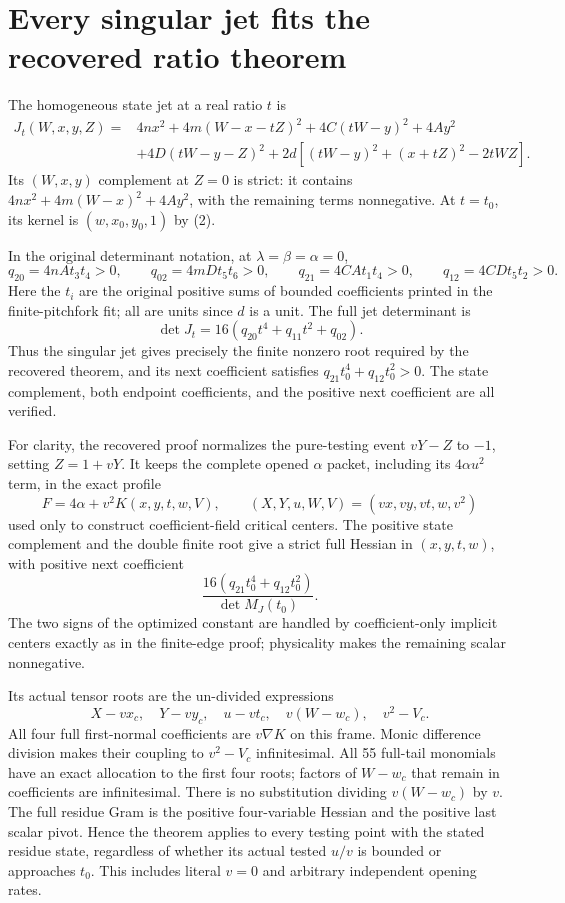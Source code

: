 \section{Every singular jet fits the recovered ratio theorem}

The homogeneous state jet at a real ratio $t$ is
\begin{align*}
 J_t(W,x,y,Z)={}&4nx^2+4m(W-x-tZ)^2+4C(tW-y)^2+4Ay^2\\
 &+4D(tW-y-Z)^2
   +2d[(tW-y)^2+(x+tZ)^2-2tWZ].
\end{align*}
Its $(W,x,y)$ complement at $Z=0$ is strict: it contains
$4nx^2+4m(W-x)^2+4Ay^2$, with the remaining terms nonnegative.
At $t=t_0$, its kernel is $(w,x_0,y_0,1)$ by (2).

In the original determinant notation, at $\lambda=\beta=\alpha=0$,
\[
 q_{20}=4nAt_3t_4>0,\qquad q_{02}=4mDt_5t_6>0,
 \qquad q_{21}=4CAt_1t_4>0,\qquad q_{12}=4CDt_5t_2>0.
\]
Here the $t_i$ are the original positive sums of bounded coefficients
printed in the finite-pitchfork fit; all are units since $d$ is a
unit. The full jet determinant is
\[
 \det J_t=16(q_{20}t^4+q_{11}t^2+q_{02}).
\]
Thus the singular jet gives precisely the finite nonzero root required
by the recovered theorem, and its next coefficient satisfies
$q_{21}t_0^4+q_{12}t_0^2>0$. The state complement, both endpoint
coefficients, and the positive next coefficient are all verified.

For clarity, the recovered proof normalizes the pure-testing event
$vY-Z$ to $-1$, setting $Z=1+vY$. It keeps the complete opened
$\alpha$ packet, including its $4\alpha u^2$ term, in the exact
profile
\[
 F=4\alpha+v^2K(x,y,t,w,V),\qquad
 (X,Y,u,W,V)=(vx,vy,vt,w,v^2)
\]
used only to construct coefficient-field critical centers. The positive
state complement and the double finite root give a strict full Hessian
in $(x,y,t,w)$, with positive next coefficient
\[
 \frac{16(q_{21}t_0^4+q_{12}t_0^2)}{\det M_J(t_0)}.
\]
The two signs of the optimized constant are handled by coefficient-only
implicit centers exactly as in the finite-edge proof; physicality makes
the remaining scalar nonnegative.

Its actual tensor roots are the un-divided expressions
\[
 X-vx_c,\quad Y-vy_c,\quad u-vt_c,\quad v(W-w_c),
 \quad v^2-V_c.
\]
All four full first-normal coefficients are $v\nabla K$ on this
frame. Monic difference division makes their coupling to $v^2-V_c$
infinitesimal. All 55 full-tail monomials have an exact allocation to
the first four roots; factors of $W-w_c$ that remain in coefficients
are infinitesimal. There is no substitution dividing $v(W-w_c)$ by
$v$. The full residue Gram is the positive four-variable Hessian and
the positive last scalar pivot. Hence the theorem applies to every
testing point with the stated residue state, regardless of whether its
actual tested $u/v$ is bounded or approaches $t_0$. This includes literal
$v=0$ and arbitrary independent opening rates.

